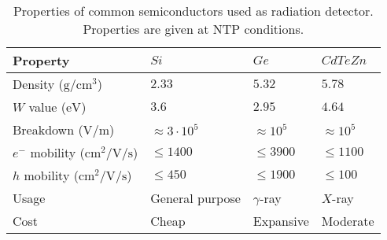 \begin{table}[!ht]
	\centering
	\caption[]{Properties of common semiconductors \cite{NSM2005,Eisen1996} used as radiation detector. Properties are given at NTP conditions.}
	\label{chap3:semiconductor}
	\begin{tabular}{llll}
    \toprule
    Property & $Si$ & $Ge$ & $CdTeZn$ \\
    \midrule
    Density ($\mathrm{g/cm^3}$)& $2.33$  & $5.32$ & $5.78$ \\
    $W$ value ($\mathrm{eV}$) & $3.6$ & $2.95$ & $4.64$ \\
    Breakdown ($\mathrm{V/m}$) & $\approx 3\cdot10^5$ & $\approx 10^5$ & $\approx 10^5$\\
    $e^{-}$ mobility ($\mathrm{cm^{2}/V/s}$) & $\leq 1400$ & $\leq 3900$ & $\leq 1100$\\
    $h$ mobility ($\mathrm{cm^{2}/V/s}$) & $\leq 450$ & $\leq 1900$ & $\leq 100$ \\
    Usage & General purpose & $\gamma$-ray & $X$-ray\\
    Cost & Cheap & Expansive & Moderate\\
		\bottomrule
	\end{tabular}
\end{table}